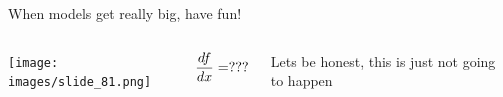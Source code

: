 \documentclass[aspectratio=169, usenames,dvipsnames, 14pt]{beamer}
\begin{document}
% 
% 
% 
% 
% 
% 
% 
% 



\begin{frame}{When models get really big, have fun!}
\begin{columns}
        \texttt{[image: images/slide\_81.png]}
    
        \begin{center}
            
        
        \begin{equation*}
            \LARGE\frac{df}{dx} = ???
        \end{equation*}
        \end{center}
        Lets be honest, this is just not going to happen
    
\end{columns}
    
\end{frame}
\end{document}
